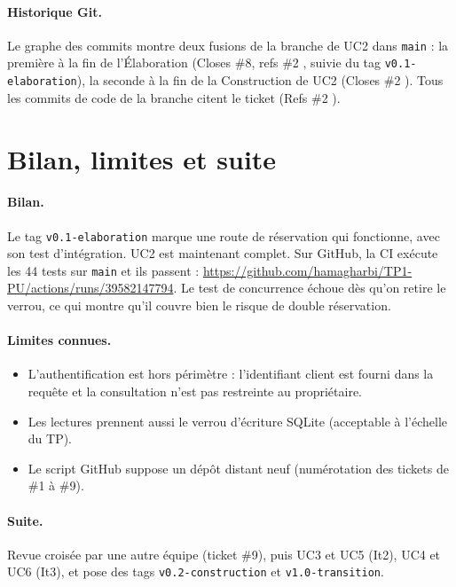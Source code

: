 \documentclass[11pt,a4paper]{article}
\begin{document}
\paragraph{Historique Git.} Le graphe des commits montre deux fusions de la
branche de UC2 dans \texttt{main} : la première à la fin
de l'Élaboration (\og Closes \#8, refs \#2 \fg{}, suivie du tag
\texttt{v0.1-elaboration}), la seconde à la fin de la Construction de UC2
(\og Closes \#2 \fg{}). Tous les commits de code de la branche citent le ticket
(\og Refs \#2 \fg{}).

\section{Bilan, limites et suite}

\paragraph{Bilan.}
Le tag \texttt{v0.1-elaboration} marque une route de réservation qui fonctionne,
avec son test d'intégration. UC2 est maintenant complet. Sur GitHub, la CI exécute
les 44 tests sur \texttt{main} et ils passent :
\url{https://github.com/hamagharbi/TP1-PU/actions/runs/39582147794}. Le test de
concurrence échoue dès qu'on retire le verrou, ce qui montre qu'il couvre bien le
risque de double réservation.

\paragraph{Limites connues.}
\begin{itemize}
  \item L'authentification est hors périmètre : l'identifiant client est fourni dans
        la requête et la consultation n'est pas restreinte au propriétaire.
  \item Les lectures prennent aussi le verrou d'écriture SQLite (acceptable à
        l'échelle du TP).
  \item Le script GitHub suppose un dépôt distant neuf (numérotation des tickets
        de \#1 à \#9).
\end{itemize}

\paragraph{Suite.}
Revue croisée par une autre équipe (ticket \#9), puis UC3 et UC5 (It2), UC4 et UC6
(It3), et pose des tags \texttt{v0.2-construction} et \texttt{v1.0-transition}.
\end{document}
